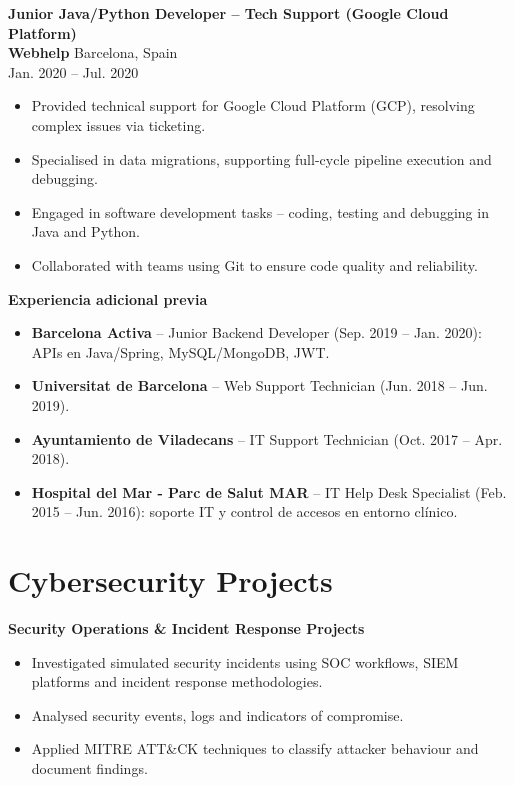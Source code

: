 \documentclass[10pt,a4paper]{article}
\begin{document}
\textbf{Junior Java/Python Developer -- Tech Support (Google Cloud Platform)}\\
\textbf{Webhelp} \hfill Barcelona, Spain\\
Jan. 2020 -- Jul. 2020

\begin{itemize}
\item Provided technical support for Google Cloud Platform (GCP), resolving complex issues via ticketing.
\item Specialised in data migrations, supporting full-cycle pipeline execution and debugging.
\item Engaged in software development tasks -- coding, testing and debugging in Java and Python.
\item Collaborated with teams using Git to ensure code quality and reliability.
\end{itemize}

\textbf{Experiencia adicional previa}\\
\begin{itemize}
\item \textbf{Barcelona Activa} -- Junior Backend Developer (Sep. 2019 -- Jan. 2020): APIs en Java/Spring, MySQL/MongoDB, JWT.
\item \textbf{Universitat de Barcelona} -- Web Support Technician (Jun. 2018 -- Jun. 2019).
\item \textbf{Ayuntamiento de Viladecans} -- IT Support Technician (Oct. 2017 -- Apr. 2018).
\item \textbf{Hospital del Mar - Parc de Salut MAR} -- IT Help Desk Specialist (Feb. 2015 -- Jun. 2016): soporte IT y control de accesos en entorno clínico.
\end{itemize}

\section*{Cybersecurity Projects}
\textbf{Security Operations \& Incident Response Projects}
\begin{itemize}
\item Investigated simulated security incidents using SOC workflows, SIEM platforms and incident response methodologies.
\item Analysed security events, logs and indicators of compromise.
\item Applied MITRE ATT\&CK techniques to classify attacker behaviour and document findings.
\end{itemize}
\end{document}
